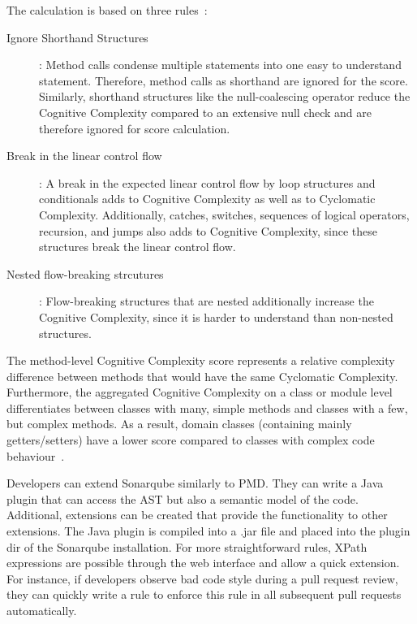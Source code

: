 The calculation is based on three rules~\cite{campbell2018cognitive}:
\begin{description}
    \item[Ignore Shorthand Structures]: Method calls condense multiple statements into one easy to understand statement. Therefore, method calls as shorthand are ignored for the score. Similarly, shorthand structures like the null-coalescing operator reduce the Cognitive Complexity compared to an extensive null check and are therefore ignored for score calculation.
    \item[Break in the linear control flow]: A break in the expected linear control flow by loop structures and conditionals adds to Cognitive Complexity as well as to Cyclomatic Complexity. Additionally, catches, switches, sequences of logical operators, recursion, and jumps also adds to Cognitive Complexity, since these structures break the linear control flow.
    \item[Nested flow-breaking strcutures]: Flow-breaking structures that are nested additionally increase the Cognitive Complexity, since it is harder to understand than non-nested structures.  
\end{description}
The method-level Cognitive Complexity score represents a relative complexity difference between methods that would have the same Cyclomatic Complexity. Furthermore, the aggregated Cognitive Complexity on a class or module level differentiates between classes with many, simple methods and classes with a few, but complex methods. As a result, domain classes (containing mainly getters/setters) have a lower score compared to classes with complex code behaviour~\cite{campbell2018cognitive}.

Developers can extend Sonarqube similarly to PMD. They can write a Java plugin that can access the AST but also a semantic model of the code. Additional, extensions can be created that provide the functionality to other extensions. The Java plugin is compiled into a .jar file and placed into the plugin dir of the Sonarqube installation. For more straightforward rules, XPath expressions are possible through the web interface and allow a quick extension. For instance, if developers observe bad code style during a pull request review, they can quickly write a rule to enforce this rule in all subsequent pull requests automatically.

